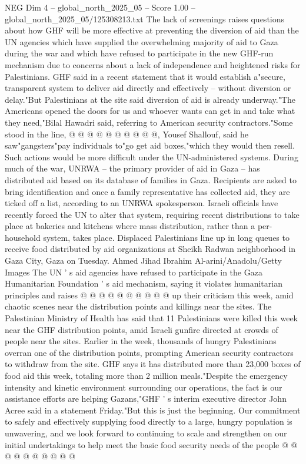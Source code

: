 \begin{textsample}{NEG Dim 4 – global\_north\_2025\_05 – Score 1.00 – global\_north\_2025\_05/125308213.txt}
The lack of screenings raises questions about how GHF will be more effective at preventing the diversion of aid than the UN agencies which have supplied the overwhelming majority of aid to Gaza during the war and which have refused to participate in the new GHF-run mechanism due to concerns about a lack of independence and heightened risks for Palestinians.
GHF said in a recent statement that it would establish a"secure, transparent system to deliver aid directly and effectively -- without diversion or delay."But Palestinians at the site said diversion of aid is already underway."The Americans opened the doors for us and whoever wants can get in and take what they need,"Bilal Hawadri said, referring to American security contractors."Some stood in the line, @ @ @ @ @ @ @ @ @ @, Yousef Shallouf, said he saw"gangsters"pay individuals to"go get aid boxes,"which they would then resell.
Such actions would be more difficult under the UN-administered systems.
During much of the war, UNRWA -- the primary provider of aid in Gaza -- has distributed aid based on its database of families in Gaza.
Recipients are asked to bring identification and once a family representative has collected aid, they are ticked off a list, according to an UNRWA spokesperson.
Israeli officials have recently forced the UN to alter that system, requiring recent distributions to take place at bakeries and kitchens where mass distribution, rather than a per-household system, takes place.
Displaced Palestinians line up in long queues to receive food distributed by aid organizations at Sheikh Radwan neighborhood in Gaza City, Gaza on Tuesday.
Ahmed Jihad Ibrahim Al-arini/Anadolu/Getty Images The UN ' s aid agencies have refused to participate in the Gaza Humanitarian Foundation ' s aid mechanism, saying it violates humanitarian principles and raises @ @ @ @ @ @ @ @ @ @ up their criticism this week, amid chaotic scenes near the distribution points and killings near the sites.
The Palestinian Ministry of Health has said that 11 Palestinians were killed this week near the GHF distribution points, amid Israeli gunfire directed at crowds of people near the sites.
Earlier in the week, thousands of hungry Palestinians overran one of the distribution points, prompting American security contractors to withdraw from the site.
GHF says it has distributed more than 23,000 boxes of food aid this week, totaling more than 2 million meals."Despite the emergency intensity and kinetic environment surrounding our operations, the fact is our assistance efforts are helping Gazans,"GHF ' s interim executive director John Acree said in a statement Friday."But this is just the beginning.
Our commitment to safely and effectively supplying food directly to a large, hungry population is unwavering, and we look forward to continuing to scale and strengthen on our initial undertakings to help meet the basic food security needs of the people @ @ @ @ @ @ @ @ @ @

\end{textsample}
